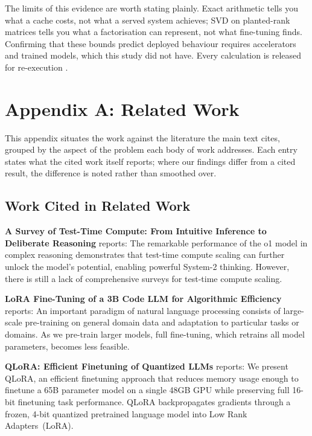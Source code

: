 \documentclass[10pt,twocolumn,letterpaper]{article}
\begin{document}
The limits of this evidence are worth stating plainly. Exact arithmetic tells you what a cache costs, not what a served system achieves; SVD on planted-rank matrices tells you what a factorisation can represent, not what fine-tuning finds. Confirming that these bounds predict deployed behaviour requires accelerators and trained models, which this study did not have. Every calculation is released for re-execution \cite{arxiv_2406_00584,crossref_10_1201_9788743808145_14}.





\section{Appendix A: Related Work}


This appendix situates the work against the literature the main text cites, grouped by the aspect of the problem each body of work addresses. Each entry states what the cited work itself reports; where our findings differ from a cited result, the difference is noted rather than smoothed over.


\subsection{Work Cited in Related Work}


\textbf{A Survey of Test-Time Compute: From Intuitive Inference to Deliberate Reasoning} \cite{arxiv_2501_02497} reports: The remarkable performance of the o1 model in complex reasoning demonstrates that test-time compute scaling can further unlock the model's potential, enabling powerful System-2 thinking. However, there is still a lack of comprehensive surveys for test-time compute scaling.

\textbf{LoRA Fine-Tuning of a 3B Code LLM for Algorithmic Efficiency} \cite{crossref_10_48550_arxiv_2106_09685} reports: An important paradigm of natural language processing consists of large-scale pre-training on general domain data and adaptation to particular tasks or domains. As we pre-train larger models, full fine-tuning, which retrains all model parameters, becomes less feasible.

\textbf{QLoRA: Efficient Finetuning of Quantized LLMs} \cite{crossref_10_48550_arxiv_2305_14314} reports: We present QLoRA, an efficient finetuning approach that reduces memory usage enough to finetune a 65B parameter model on a single 48GB GPU while preserving full 16-bit finetuning task performance. QLoRA backpropagates gradients through a frozen, 4-bit quantized pretrained language model into Low Rank Adapters~(LoRA).
\end{document}
